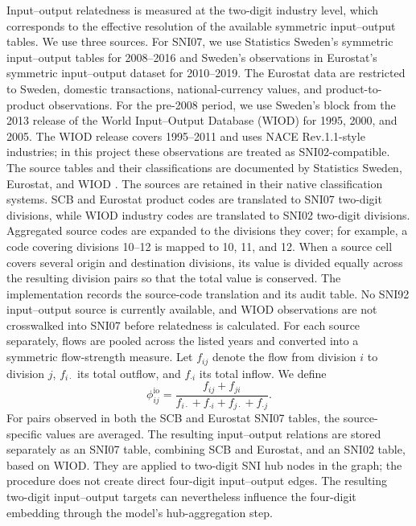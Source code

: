 \documentclass[9pt,twoside]{pnas-new}
\begin{document}
Input--output relatedness is measured at the two-digit industry level, which corresponds to the effective resolution of the available symmetric input--output tables. We use three sources. For SNI07, we use Statistics Sweden's symmetric input--output tables for 2008--2016 and Sweden's observations in Eurostat's symmetric input--output dataset for 2010--2019. The Eurostat data are restricted to Sweden, domestic transactions, national-currency values, and product-to-product observations. For the pre-2008 period, we use Sweden's block from the 2013 release of the World Input--Output Database (WIOD) for 1995, 2000, and 2005. The WIOD release covers 1995--2011 and uses NACE Rev.1.1-style industries; in this project these observations are treated as SNI02-compatible. The source tables and their classifications are documented by Statistics Sweden, Eurostat, and WIOD \citep{statisticsswedenInputOutputTables2019,eurostat_suiot,timmerIllustratedUserGuide2015}.
The sources are retained in their native classification systems. SCB and Eurostat product codes are translated to SNI07 two-digit divisions, while WIOD industry codes are translated to SNI02 two-digit divisions. Aggregated source codes are expanded to the divisions they cover; for example, a code covering divisions 10--12 is mapped to 10, 11, and 12. When a source cell covers several origin and destination divisions, its value is divided equally across the resulting division pairs so that the total value is conserved. The implementation records the source-code translation and its audit table. No SNI92 input--output source is currently available, and WIOD observations are not crosswalked into SNI07 before relatedness is calculated.
For each source separately, flows are pooled across the listed years and converted into a symmetric flow-strength measure. Let \(f_{ij}\) denote the flow from division \(i\) to division \(j\), \(f_{i\cdot}\) its total outflow, and \(f_{\cdot i}\) its total inflow. We define
\begin{equation}
\phi^{\mathrm{io}}_{ij}=
\frac{f_{ij}+f_{ji}}
{f_{i\cdot}+f_{\cdot i}+f_{j\cdot}+f_{\cdot j}} .
\label{eq:io-relatedness}
\end{equation}
For pairs observed in both the SCB and Eurostat SNI07 tables, the source-specific values are averaged. The resulting input--output relations are stored separately as an SNI07 table, combining SCB and Eurostat, and an SNI02 table, based on WIOD. They are applied to two-digit SNI hub nodes in the graph; the procedure does not create direct four-digit input--output edges. The resulting two-digit input--output targets can nevertheless influence the four-digit embedding through the model's hub-aggregation step.
\end{document}
